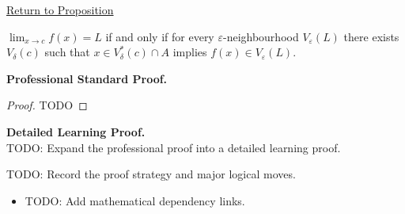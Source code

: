 \newpage
{}
\label{prf:limit-neighbourhood-equiv}

\begin{remark*}[Return]
\hyperref[prop:limit-neighbourhood-equiv]{Return to Proposition}
\end{remark*}

\begin{proposition*}
$\lim_{x\to c}f(x)=L$ if and only if for every $\varepsilon$-neighbourhood $V_\varepsilon(L)$ there exists $V_\delta(c)$ such that $x\in V_\delta^*(c)\cap A$ implies $f(x)\in V_\varepsilon(L)$.
\end{proposition*}

\textbf{Professional Standard Proof.}~\\
\begin{proof}
TODO
\end{proof}

\textbf{Detailed Learning Proof.}~\\
TODO: Expand the professional proof into a detailed learning proof.

\begin{remark*}
TODO: Record the proof strategy and major logical moves.
\end{remark*}

\begin{dependencies}
\begin{itemize}
  \item TODO: Add mathematical dependency links.
\end{itemize}
\end{dependencies}
